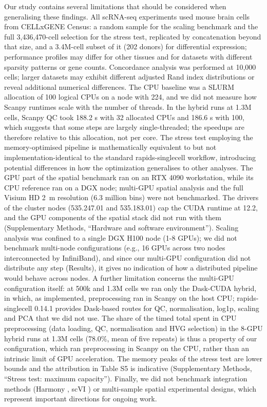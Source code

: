 \documentclass[runningheads]{llncs}
\begin{document}
Our study contains several limitations that should be considered when generalising these findings. All scRNA-seq experiments used mouse brain cells from CELLxGENE Census: a random sample for the scaling benchmark and the full 3,436,470-cell selection for the stress test, replicated by concatenation beyond that size, and a 3.4M-cell subset of it (202 donors) for differential expression; performance profiles may differ for other tissues and for datasets with different sparsity patterns or gene counts. Concordance analysis was performed at 10,000 cells; larger datasets may exhibit different adjusted Rand index distributions or reveal additional numerical differences. The CPU baseline was a SLURM allocation of 100 logical CPUs on a node with 224, and we did not measure how Scanpy runtimes scale with the number of threads. In the hybrid runs at 1.3M cells, Scanpy QC took 188.2 s with 32 allocated CPUs and 186.6 s with 100, which suggests that some steps are largely single-threaded; the speedups are therefore relative to this allocation, not per core. The stress test employing the memory-optimised pipeline is mathematically equivalent to but not implementation-identical to the standard rapids-singlecell workflow, introducing potential differences in how the optimization generalises to other analyses. The GPU part of the spatial benchmark ran on an RTX 4090 workstation, while its CPU reference ran on a DGX node; multi-GPU spatial analysis and the full Visium HD 2~\textmu{}m resolution (6.3 million bins) were not benchmarked. The drivers of the cluster nodes (535.247.01 and 535.183.01) cap the CUDA runtime at 12.2, and the GPU components of the spatial stack did not run with them (Supplementary Methods, ``Hardware and software environment''). Scaling analysis was confined to a single DGX H100 node (1-8 GPUs); we did not benchmark multi-node configurations (e.g., 16 GPUs across two nodes interconnected by InfiniBand), and since our multi-GPU configuration did not distribute any step (Results), it gives no indication of how a distributed pipeline would behave across nodes. A further limitation concerns the multi-GPU configuration itself: at 500k and 1.3M cells we ran only the Dask-CUDA hybrid, in which, as implemented, preprocessing ran in Scanpy on the host CPU; rapids-singlecell 0.14.1 provides Dask-based routes for QC, normalisation, log1p, scaling and PCA that we did not use. The share of the timed total spent in CPU preprocessing (data loading, QC, normalisation and HVG selection) in the 8-GPU hybrid runs at 1.3M cells (78.0\%, mean of five repeats) is thus a property of our configuration, which ran preprocessing in Scanpy on the CPU, rather than an intrinsic limit of GPU acceleration. The memory peaks of the stress test are lower bounds and the attribution in Table S5 is indicative (Supplementary Methods, ``Stress test: maximum capacity''). Finally, we did not benchmark integration methods (Harmony \cite{Korsunsky2019}, scVI \cite{Lopez2018}) or multi-sample spatial experimental designs, which represent important directions for ongoing work.




\end{document}
